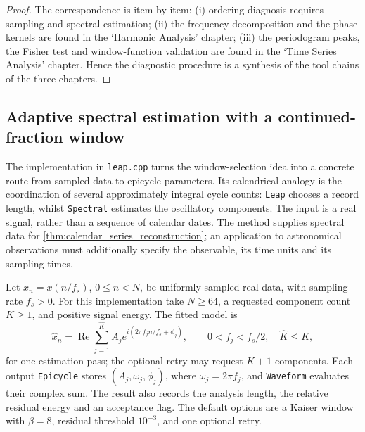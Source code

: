 \begin{proof}
The correspondence is item by item:
(i) ordering diagnosis requires sampling and spectral estimation;
(ii) the frequency decomposition and the phase kernels are found in the `Harmonic Analysis' chapter;
(iii) the periodogram peaks, the Fisher test and window-function validation are found in the `Time Series Analysis' chapter.
Hence the diagnostic procedure is a synthesis of the tool chains of the three chapters.
\end{proof}

\subsection{Adaptive spectral estimation with a continued-fraction window}
\label{sec:calendar_leap_spectral}

The implementation in \texttt{leap.cpp} turns the window-selection idea into a concrete route from sampled data to epicycle parameters. Its calendrical analogy is the coordination of several approximately integral cycle counts: \texttt{Leap} chooses a record length, whilst \texttt{Spectral} estimates the oscillatory components. The input is a real signal, rather than a sequence of calendar dates. The method supplies spectral data for \cref{thm:calendar_series_reconstruction}; an application to astronomical observations must additionally specify the observable, its time units and its sampling times.

\begin{definition}\label{def:calendar_leap_input}
Let \(x_n=x(n/f_s)\), \(0\le n<N\), be uniformly sampled real data, with sampling rate \(f_s>0\). For this implementation take \(N\ge64\), a requested component count \(K\ge1\), and positive signal energy. The fitted model is
\[
\widehat x_n=\operatorname{Re}\sum_{j=1}^{\widehat K}
 A_j e^{i(2\pi f_j n/f_s+\phi_j)},\qquad
0<f_j<f_s/2,\quad \widehat K\le K,
\]
for one estimation pass; the optional retry may request \(K+1\) components. Each output \texttt{Epicycle} stores \((A_j,\omega_j,\phi_j)\), where \(\omega_j=2\pi f_j\), and \texttt{Waveform} evaluates their complex sum. The result also records the analysis length, the relative residual energy and an acceptance flag. The default options are a Kaiser window with \(\beta=8\), residual threshold \(10^{-3}\), and one optional retry.
\end{definition}

